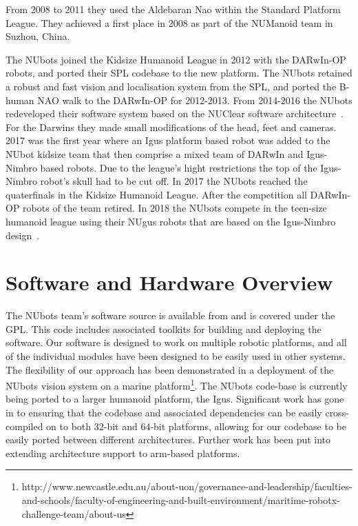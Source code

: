 \documentclass{llncs}
\begin{document}
From 2008 to 2011 they used the Aldebaran Nao within the Standard Platform League. They achieved a first place in 2008 as part of the NUManoid team in Suzhou, China.

The NUbots joined the Kidsize Humanoid League in 2012 with the DARwIn-OP robots, and ported their SPL codebase to the new platform. The NUbots retained a robust and fast vision and localisation system from the SPL, and ported the B-human NAO walk to the DARwIn-OP for 2012-2013. From 2014-2016 the NUbots redeveloped their software system based on the NUClear software architecture~\cite{HoulistonEtAl2015}. For the Darwins they made small modifications of the head, feet and cameras. 2017 was the first year where an Igus platform based robot was added to the NUbot kidsize team that then comprise a mixed team of DARwIn and Igus-Nimbro based robots.  Due to the league's hight restrictions the top of the Igus-Nimbro robot's skull had to be cut off. In 2017 the NUbots reached the quaterfinals in the Kidsize Humanoid League. After the competition all DARwIn-OP robots of the team retired. In 2018 the NUbots compete in the teen-size humanoid league using their NUgus robots that are based on the Igus-Nimbro design~\cite{allgeuer2016igus}.




\section{Software and Hardware Overview}
The NUbots team's software source is available from \cite{nubotsGit} and is covered under the GPL. This code includes associated toolkits for building and deploying the software. Our software is designed to work on multiple robotic platforms, and all of the individual modules have been designed to be easily used in other systems. The flexibility of our approach has been demonstrated in a deployment of the NUbots vision system on a marine platform\footnote{http://www.newcastle.edu.au/about-uon/governance-and-leadership/faculties-and-schools/faculty-of-engineering-and-built-environment/maritime-robotx-challenge-team/about-us}. The NUbots code-base is currently being ported to a larger humanoid platform, the Igus. Significant work has gone in to ensuring that the codebase and associated dependencies can be easily cross-compiled on to both 32-bit and 64-bit platforms, allowing for our codebase to be easily ported between different architectures. Further work has been put into extending architecture support to arm-based platforms.%
\end{document}
